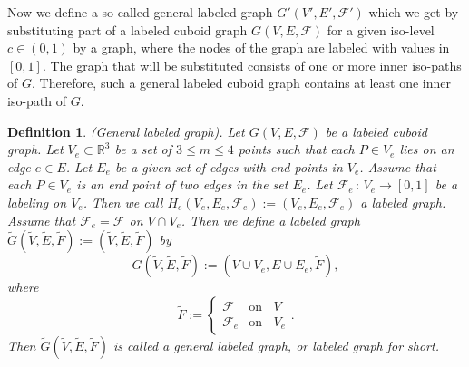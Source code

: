 \documentclass[a4paper,11pt]{article}
\newtheorem{definition}[theorem]{Definition}
\begin{document}
Now we define a so-called general labeled graph $G'(V',E',\mathcal{F}')$ which we get by substituting
part of a labeled cuboid graph $G(V,E,\mathcal{F})$ for a given iso-level $c\in (0,1)$ by a graph, where the
nodes of the graph are labeled with values in $[0,1]$. The graph that will be substituted consists of
one or more inner iso-paths of $G$. Therefore, such a general labeled cuboid graph contains at least one
inner iso-path of $G$.
\begin{definition}(General labeled graph). Let $G(V,E,\mathcal{F})$ be a labeled cuboid graph.
Let $V_e\subset\mathbb{R}^3$ be a set of $3\leq m\leq 4$ points such that each $P\in V_e$ lies on
an edge $e\in E$. Let $E_e$ be a given set of edges with end points in $V_e$. Assume that each
$P\in V_e$ is an end point of two edges in the set $E_e$.
Let $\mathcal{F}_e\,:\,V_e\longrightarrow [0,1]$ be a labeling on $V_e$.
Then we call $H_e(V_e,E_e,\mathcal{F}_e):=(V_e,E_e,\mathcal{F}_e)$ a labeled graph.
Assume that $\mathcal{F}_e=\mathcal{F}$ on $V\cap V_e$. Then we define a labeled graph
$\tilde{G}(\tilde{V},\tilde{E},\tilde{F}):=(\tilde{V},\tilde{E},\tilde{F})$ by
\begin{equation}
G(\tilde{V},\tilde{E},\tilde{F}):=(V\cup V_e,E\cup E_e,\tilde{F}),
\end{equation}
where
\begin{equation}
\tilde{F}:=\left\{
   \begin{array}{ll}
     \mathcal{F} & \mbox{on }\;\; V \\
     \mathcal{F}_e & \mbox{on }\;\; V_e
   \end{array}\right..
\label{eq:labeled-graph-9a}
\end{equation}
Then $\tilde{G}(\tilde{V},\tilde{E},\tilde{F})$ is called a general labeled graph, or labeled graph for short.
\label{def:labeled-graph-4a}
\end{definition}
\end{document}
